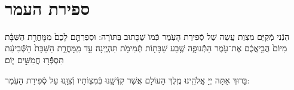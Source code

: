 \documentclass[twoside, openany, parskip=half, 11pt]{book}
\begin{document}
\quad{}\quad{}\\

\section{ספירת העמר}
\label{sefiras haomer}

הִנְֿנִי מְֿקַיֵּם מִצְוַת עֲשֵה שֶׁל סְֿפִירַת הָעֽׂמֶר כְּֿמוׂ שֶׁכָּתוּב בַּתּוׂרָה: וּסְפַרְתֶּ֤ם לָכֶם֙ מִמׇּחֳרַ֣ת הַשַּׁבָּ֔ת מִיּוֹם֙ הֲבִ֣יאֲכֶ֔ם אֶת־עֹ֖מֶר הַתְּֿֿנוּפָ֑ה שֶׁ֥בַע שַׁבָּת֖וֹת תְּֿמִימֹ֥ת תִּהְיֶֽינָה׃ עַ֣ד מִֽמׇּחֳרַ֤ת הַשַּׁבָּת֙ הַשְּֿֿׁבִיעִ֔ת תִּסְפְּֿֿֿר֖וּ חֲמִשִּׁ֣ים י֑וֹם׃

בָּרוּךְ אַתָּה יְיָ אֱלֹהֵֽינוּ מֶֽלֶךְ הָעוֹלָם אֲשֶׁר קִדְּֿשָֽׁנוּ בְּֿמִצְוֹתָיו וְֿצִוָּֽנוּ עַל סְֿפִירַת הָעֹֽמֶר:\\
\end{document}
